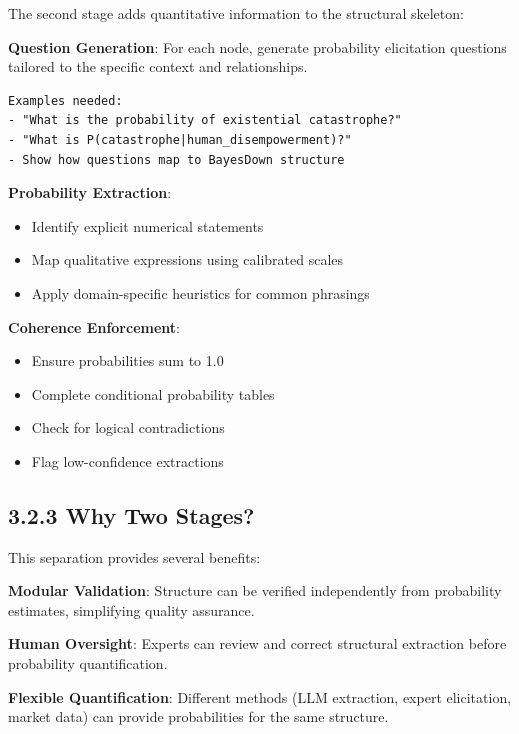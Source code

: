 \documentclass[
  11pt,
  letterpaper,
]{book}
\providecommand{\tightlist}{%
  \setlength{\itemsep}{0pt}\setlength{\parskip}{0pt}}
\begin{document}
The second stage adds quantitative information to the structural
skeleton:

\textbf{Question Generation}: For each node, generate probability
elicitation questions tailored to the specific context and
relationships.

\begin{verbatim}
Examples needed:
- "What is the probability of existential catastrophe?"
- "What is P(catastrophe|human_disempowerment)?"
- Show how questions map to BayesDown structure
\end{verbatim}

\textbf{Probability Extraction}:

\begin{itemize}
\tightlist
\item
  Identify explicit numerical statements
\item
  Map qualitative expressions using calibrated scales
\item
  Apply domain-specific heuristics for common phrasings
\end{itemize}

\textbf{Coherence Enforcement}:

\begin{itemize}
\tightlist
\item
  Ensure probabilities sum to 1.0
\item
  Complete conditional probability tables
\item
  Check for logical contradictions
\item
  Flag low-confidence extractions
\end{itemize}

\subsection*{3.2.3 Why Two Stages?}\label{sec-why-two-stages}

This separation provides several benefits:

\textbf{Modular Validation}: Structure can be verified independently
from probability estimates, simplifying quality assurance.

\textbf{Human Oversight}: Experts can review and correct structural
extraction before probability quantification.

\textbf{Flexible Quantification}: Different methods (LLM extraction,
expert elicitation, market data) can provide probabilities for the same
structure.
\end{document}
